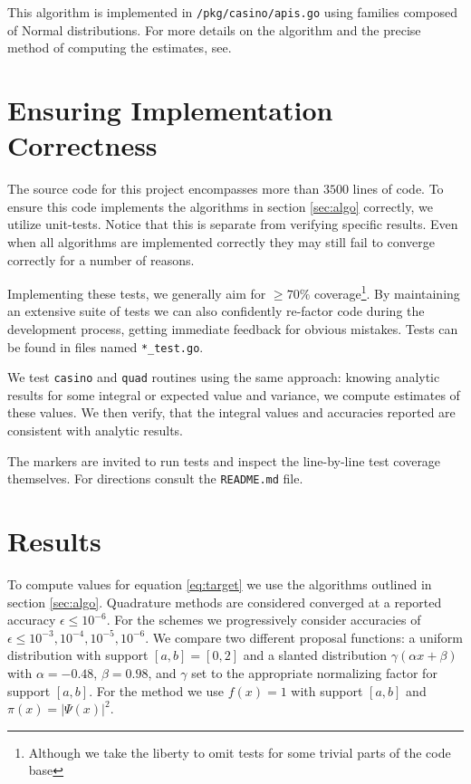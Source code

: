 \documentclass[10pt, a4paper]{article}
\begin{document}
  This algorithm is implemented in \texttt{/pkg/casino/apis.go} using families composed of Normal distributions.
  For more details on the algorithm and the precise method of computing the estimates, see\cite{apis}.

\section{Ensuring Implementation Correctness}
  \label{sec:tests}
  The source code for this project encompasses more than $3500$ lines of code\footnotemark. To ensure
  this code implements the algorithms in section \ref{sec:algo} correctly, we utilize unit-tests.
  Notice that this is separate from verifying specific results. Even when all algorithms are
  implemented correctly they may still fail to converge correctly for a number of reasons\cite{nr}.


  Implementing these tests, we generally aim for $\ge 70\%$ coverage\footnote{Although
  we take the liberty to omit tests for some trivial parts of the code base}. By maintaining an extensive
  suite of tests we can also confidently re-factor code during the development process, getting immediate
  feedback for obvious mistakes. Tests can be found in files named \texttt{*\_test.go}.

  We test \texttt{casino} and \texttt{quad} routines using the same approach: knowing analytic
  results for some integral or expected value and variance, we compute estimates
  of these values. We then verify, that the integral values and accuracies reported are consistent with
  analytic results.

  The markers are invited to run tests and inspect the line-by-line test coverage themselves.
  For directions consult the \texttt{README.md} file.

\section{Results}
  \label{sec:results}
  To compute values for equation \ref{eq:target} we use the algorithms outlined in section \ref{sec:algo}.
  Quadrature methods are considered converged at a reported accuracy $\epsilon \le 10^{-6}$.
  For the \is{} schemes we progressively consider accuracies of $\epsilon \le 10^{-3},10^{-4},10^{-5},10^{-6}$.
  We compare two different proposal functions: a uniform distribution with support $[a,b] = [0,2]$ and
  a slanted distribution $\gamma(\alpha x + \beta)$ with $\alpha = -0.48$, $\beta = 0.98$, and
  $\gamma$ set to the appropriate normalizing factor for support $[a,b]$.
  For the \apis{} method we use $f(x) = 1$ with support $[a,b]$ and $\pi(x) = |\Psi(x)|^2$.
\end{document}
